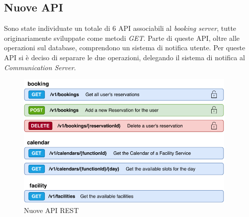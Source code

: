 \subsection{Nuove API}
Sono state individuate un totale di 6 API associabili al \emph{booking server}, tutte originariamente sviluppate come metodi \emph{GET}. Parte di queste API, oltre alle operazioni sul database, comprendono un sistema di notifica utente. Per queste API si è deciso di separare le due operazioni, delegando il sistema di notifica al \emph{Communication Server}.
\begin{figure}[H]
    \centering
    \includegraphics[width=0.95\textwidth]{images/03_3_new_rest_api.pdf}
    \caption{Nuove API REST}
    \label{fig:newrestapi}
\end{figure}


